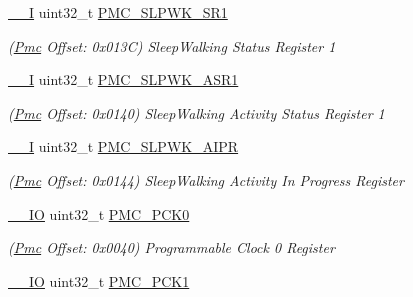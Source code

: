 \begin{DoxyCompactItemize}
\mbox{\hyperlink{core__cm7_8h_af63697ed9952cc71e1225efe205f6cd3}{\+\_\+\+\_\+I}} uint32\+\_\+t \mbox{\hyperlink{structPmc_a7825a9816e20d11f38b8f22631613d8a}{P\+M\+C\+\_\+\+S\+L\+P\+W\+K\+\_\+\+S\+R1}}
\begin{DoxyCompactList}\small\item\em (\mbox{\hyperlink{structPmc}{Pmc}} Offset\+: 0x013C) Sleep\+Walking Status Register 1 \end{DoxyCompactList}\item 
\mbox{\label{structPmc_ae9b36e4773bd23f5501e22351b96f0cc}} 
\mbox{\hyperlink{core__cm7_8h_af63697ed9952cc71e1225efe205f6cd3}{\+\_\+\+\_\+I}} uint32\+\_\+t \mbox{\hyperlink{structPmc_ae9b36e4773bd23f5501e22351b96f0cc}{P\+M\+C\+\_\+\+S\+L\+P\+W\+K\+\_\+\+A\+S\+R1}}
\begin{DoxyCompactList}\small\item\em (\mbox{\hyperlink{structPmc}{Pmc}} Offset\+: 0x0140) Sleep\+Walking Activity Status Register 1 \end{DoxyCompactList}\item 
\mbox{\label{structPmc_adca259ca795bedc99a92b226a11d46bc}} 
\mbox{\hyperlink{core__cm7_8h_af63697ed9952cc71e1225efe205f6cd3}{\+\_\+\+\_\+I}} uint32\+\_\+t \mbox{\hyperlink{structPmc_adca259ca795bedc99a92b226a11d46bc}{P\+M\+C\+\_\+\+S\+L\+P\+W\+K\+\_\+\+A\+I\+PR}}
\begin{DoxyCompactList}\small\item\em (\mbox{\hyperlink{structPmc}{Pmc}} Offset\+: 0x0144) Sleep\+Walking Activity In Progress Register \end{DoxyCompactList}\item 
\mbox{\label{structPmc_a742183eeff2ca446c38b844e544d5c66}} 
\mbox{\hyperlink{core__cm7_8h_aec43007d9998a0a0e01faede4133d6be}{\+\_\+\+\_\+\+IO}} uint32\+\_\+t \mbox{\hyperlink{structPmc_a742183eeff2ca446c38b844e544d5c66}{P\+M\+C\+\_\+\+P\+C\+K0}}
\begin{DoxyCompactList}\small\item\em (\mbox{\hyperlink{structPmc}{Pmc}} Offset\+: 0x0040) Programmable Clock 0 Register \end{DoxyCompactList}\item 
\mbox{\label{structPmc_aaf82cc3eb53e56c84c61e80a7924af74}} 
\mbox{\hyperlink{core__cm7_8h_aec43007d9998a0a0e01faede4133d6be}{\+\_\+\+\_\+\+IO}} uint32\+\_\+t \mbox{\hyperlink{structPmc_aaf82cc3eb53e56c84c61e80a7924af74}{P\+M\+C\+\_\+\+P\+C\+K1}}

\end{DoxyCompactItemize}
